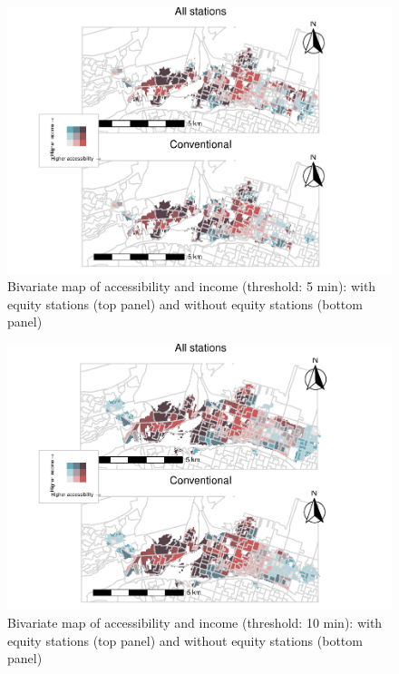 \documentclass[]{elsarticle} %
\begin{document}
\begin{figure}
\includegraphics[width=1.2\linewidth]{Bike-share-spatial-equity_files/figure-latex/figure-bi-map-threshold-5-1} \caption{\label{fig-bivariate-map-threshold-5}Bivariate map of accessibility and income (threshold: 5 min): with equity stations (top panel) and without equity stations (bottom panel)}\label{fig:figure-bi-map-threshold-5}
\end{figure}

\begin{figure}
\includegraphics[width=1.2\linewidth]{Bike-share-spatial-equity_files/figure-latex/figure-bi-map-threshold-10-1} \caption{\label{fig-bivariate-map-threshold-10}Bivariate map of accessibility and income (threshold: 10 min): with equity stations (top panel) and without equity stations (bottom panel)}\label{fig:figure-bi-map-threshold-10}
\end{figure}
\end{document}
